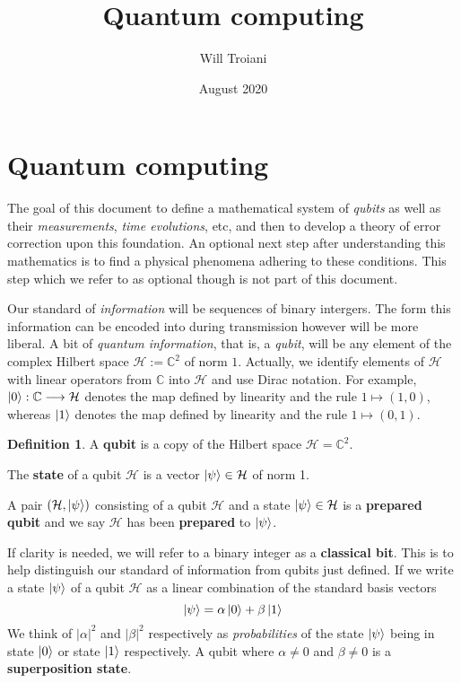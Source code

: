 \documentclass[12pt]{article}
\title{Quantum computing}
\author{Will Troiani}
\date{August 2020}
\theoremstyle{plain}
\theoremstyle{definition}
\newtheorem{defn}[thm]{Definition} %
\newcommand{\bb}[1]{\mathbb{#1}}
\newcommand{\call}[1]{\mathcal{#1}}
\newcommand{\lto}{\longrightarrow}
\begin{document}
	
	\maketitle
	\tableofcontents
	
	\section{Quantum computing}\label{sec:quantum_computing}
	The goal of this document to define a mathematical system of \emph{qubits} as well as their \emph{measurements}, \emph{time evolutions}, etc, and then to develop a theory of error correction upon this foundation. An optional next step after understanding this mathematics is to find a physical phenomena adhering to these conditions. This step which we refer to as optional though is not part of this document.
	
	Our standard of \emph{information} will be sequences of binary intergers. The form this information can be encoded into during transmission however will be more liberal. A bit of \emph{quantum information}, that is, a \emph{qubit}, will be any element of the complex Hilbert space $\call{H} := \bb{C}^2$ of norm $1$. Actually, we identify elements of $\call{H}$ with linear operators from $\bb{C}$ into $\call{H}$ and use Dirac notation. For example, $\ket{0}: \bb{C} \lto \call{H}$ denotes the map defined by linearity and the rule $1 \longmapsto (1,0)$, whereas $\ket{1}$ denotes the map defined by linearity and the rule $1 \longmapsto (0,1)$.
	\begin{defn}\label{def:qubit}
		A \textbf{qubit} is a copy of the Hilbert space $\call{H} = \bb{C}^2$.
		
		The \textbf{state} of a qubit $\call{H}$ is a vector $\ket{\psi} \in \call{H}$ of norm 1.
		
		A pair $(\call{H},\ket{\psi})$ consisting of a qubit $\call{H}$ and a state $\ket{\psi} \in \call{H}$ is a \textbf{prepared qubit} and we say $\call{H}$ has been \textbf{prepared} to $\ket{\psi}$.
		\end{defn}
	If clarity is needed, we will refer to a binary integer as a \textbf{classical bit}. This is to help distinguish our standard of information from qubits just defined. If we write a state $\ket{\psi}$ of a qubit $\call{H}$ as a linear combination of the standard basis vectors
\begin{equation}
	\ket{\psi} = \alpha\ket{0} + \beta\ket{1}
	\end{equation}
	We think of $|\alpha|^2$ and $|\beta|^2$ respectively as \emph{probabilities} of the state $\ket{\psi}$ being in state $\ket{0}$ or state $\ket{1}$ respectively. A qubit where $\alpha \neq 0$ and $\beta \neq 0$ is a \textbf{superposition state}.
	
\end{document}
